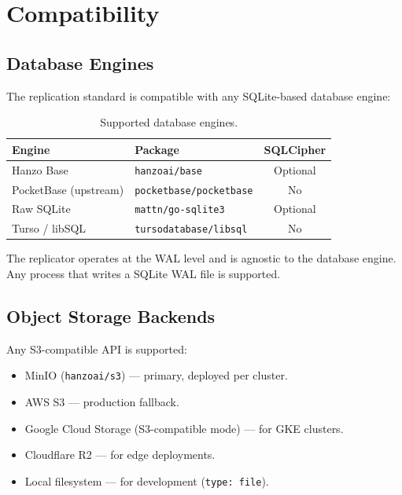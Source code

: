 \documentclass[11pt,a4paper]{article}
\begin{document}
\section{Compatibility}\label{sec:compat}

\subsection{Database Engines}

The replication standard is compatible with any SQLite-based database
engine:

\begin{table}[H]
\centering
\caption{Supported database engines.}
\label{tab:engines}
\begin{tabular}{@{}llc@{}}
\toprule
\textbf{Engine} & \textbf{Package} & \textbf{SQLCipher} \\
\midrule
Hanzo Base & \texttt{hanzoai/base} & Optional \\
PocketBase (upstream) & \texttt{pocketbase/pocketbase} & No \\
Raw SQLite & \texttt{mattn/go-sqlite3} & Optional \\
Turso / libSQL & \texttt{tursodatabase/libsql} & No \\
\bottomrule
\end{tabular}
\end{table}

The replicator operates at the WAL level and is agnostic to the
database engine. Any process that writes a SQLite WAL file is
supported.

\subsection{Object Storage Backends}

Any S3-compatible API is supported:

\begin{itemize}[nosep]
  \item MinIO (\texttt{hanzoai/s3}) --- primary, deployed per cluster.
  \item AWS S3 --- production fallback.
  \item Google Cloud Storage (S3-compatible mode) --- for GKE clusters.
  \item Cloudflare R2 --- for edge deployments.
  \item Local filesystem --- for development (\texttt{type: file}).
\end{itemize}
\end{document}
